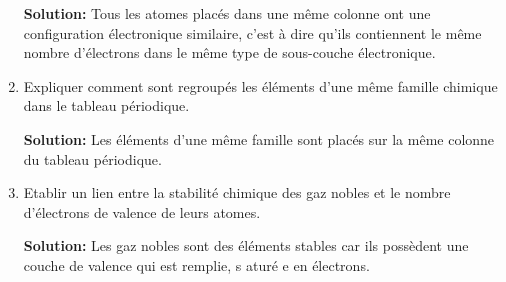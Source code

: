 \documentclass[french]{article}
\begin{document}
\begin{enumerate}
	\textbf{Solution:} Tous les atomes placés dans une même colonne ont une configuration électronique similaire, c'est à dire qu'ils contiennent le même nombre d'électrons dans le même type de sous-couche électronique.

	\item Expliquer comment sont regroupés les éléments d'une même famille chimique dans le tableau périodique.
	
	\textbf{Solution:} Les éléments d'une même famille sont placés sur la même colonne du tableau périodique.

	\item Etablir un lien entre la stabilité chimique des gaz nobles et le nombre d'électrons de valence de leurs atomes. 
	
	\textbf{Solution:} Les gaz nobles sont des éléments stables car ils possèdent une couche de valence qui est remplie, s aturé e en électrons.
\end{enumerate}









\end{document}
